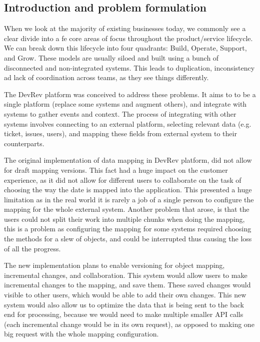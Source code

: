 \documentclass[a4paper, 12pt]{article}
\begin{document}
\subsection{Introduction and problem formulation}

When we look at the majority of existing businesses today, we commonly see a clear divide into a fe core areas of focus throughout the product/service lifecycle. We can break down this lifecycle into four quadrants: Build, Operate, Support, and Grow. These models are usually siloed and built using a bunch of disconnected and non-integrated systems. This leads to duplication, inconsistency ad lack of coordination across teams, as they see things differently. 

The DevRev platform was conceived to address these problems. It aims to to be a single platform (replace some systems and augment others), and integrate with systems to gather events and context. The process of integrating with other systems involves connecting to an external platform, selecting relevant data (e.g. ticket, issues, users), and mapping these fields from external system to their counterparts. 

The original implementation of data mapping in DevRev platform, did not allow for draft mapping versions. This fact had a huge impact on the customer experience, as it did not allow for different users to collaborate on the task of choosing the way the date is mapped into the application. This presented a huge limitation as in the real world it is rarely a job of a single person to configure the mapping for the whole external system. Another problem that arose, is that the users could not split their work into multiple chunks when doing the mapping, this is a problem as configuring the mapping for some systems required choosing the methods for a slew of objects, and could be interrupted thus causing the loss of all the progress. 

The new implementation plans to enable versioning for object mapping, incremental changes, and collaboration. This system would allow users to make incremental changes to the mapping, and save them. These saved changes would visible to other users, which would be able to add their own changes. This new system would also allow us to optimize the data that is being sent to the back end for processing, because we would need to make multiple smaller API calls (each incremental change would be in its own request), as opposed to making one big request with the whole mapping configuration. 
\end{document}
